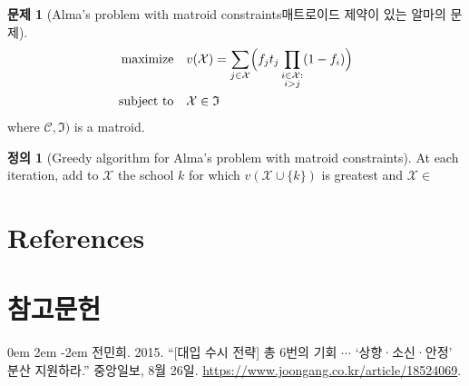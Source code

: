 \documentclass[11pt]{article} %
\newtheorem{theorem}{Theorem}
\theoremstyle{definition}
\newtheorem{definition}{Definition}
\newtheorem{problem}{Problem}
\newtheorem{theorem}{정리}
\theoremstyle{definition}
\newtheorem{definition}{정의}
\newtheorem{problem}{문제}
\begin{document}
\begin{problem}[\ifen Alma’s problem with matroid constraints\else 매트로이드 제약이 있는 알마의 문제\fi]
\begin{align}
\begin{split}
\text{maximize}\quad &  v(\mathcal{X}) = \sum_{j\in
\mathcal{X}} \Bigl( f_j t_j \prod_{\substack{i \in \mathcal{X}: \\ i > j}} (1 - f_{i}) \Bigr)\\
\text{subject to}\quad & \mathcal{X} \in \mathfrak{I}
\end{split}
\end{align}
where $\mathcal{C}, \mathfrak{I})$ is a matroid.
\end{problem}



\begin{definition}[Greedy algorithm for Alma's problem with matroid constraints]
At each iteration, add to $\mathcal{X}$ the school $k$ for which $v(\mathcal{X} \cup \{k\})$ is greatest and $\mathcal{X} \in $
\end{definition}

%
\else



















\pagebreak
\ifen
\section*{References}
\else
\section*{참고문헌}
\fi
\noindent

\parskip 0em
\leftskip 2em
\parindent -2em
\ifen \else
전민희. 2015. ``{[대입 수시 전략]} 총 6번의 기회 $\cdots$ `상향·소신·안정' 분산 지원하라.'' 중앙일보, 8월 26일. \url{https://www.joongang.co.kr/article/18524069}.\fi
\end{document}
